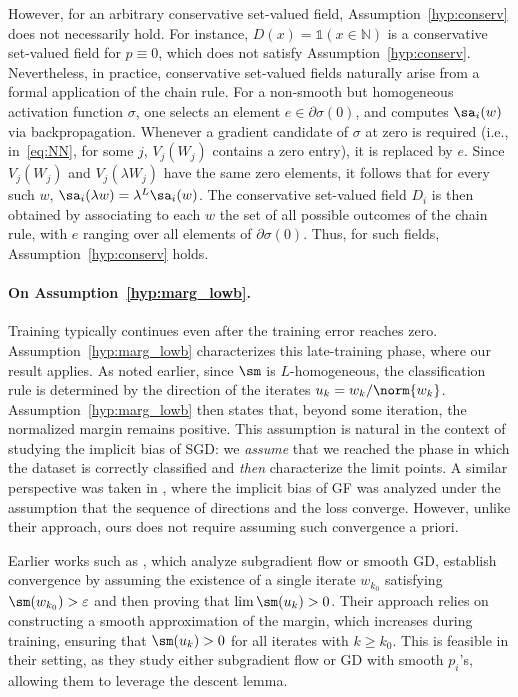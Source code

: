 However, for an arbitrary conservative set-valued field, Assumption~\ref{hyp:conserv} does not necessarily hold. For instance, $D(x) = \mathds{1}(x \in \mathbb{N})$ is a conservative set-valued field for $p \equiv 0$, which does not satisfy Assumption~\ref{hyp:conserv}. Nevertheless, in practice, conservative set-valued fields naturally arise from a formal application of the chain rule. For a non-smooth but homogeneous activation function $\sigma$, one selects an element $e \in \partial \sigma (0)$, and computes $\sa_i(w)$ via backpropagation. Whenever a gradient candidate of $\sigma$ at zero is required (i.e., in~\eqref{eq:NN}, for some $j$, $V_j(W_j)$ contains a zero entry), it is replaced by $e$. 
Since $V_j(W_j)$ and $V_j(\lambda W_j)$ have the same zero elements, it follows that for every such $w$, $
\sa_i(\lambda w) = \lambda^L \sa_i(w)$. The conservative set-valued field $D_i$ is then obtained by associating to each $w$ the set of all possible outcomes of the chain rule, with $e$ ranging over all elements of $\partial \sigma(0)$. Thus, for such fields, Assumption~\ref{hyp:conserv} holds.


\paragraph{On Assumption~\ref{hyp:marg_lowb}.} Training typically continues even after the training error reaches zero.
Assumption~\ref{hyp:marg_lowb} characterizes this late-training phase, where our result applies. 
As noted earlier, since $\sm$ is $L$-homogeneous, the classification rule is determined by the direction of the  iterates $u_k=w_k/\norm{w_k}$. Assumption~\ref{hyp:marg_lowb} then states that, beyond some iteration, the normalized margin remains positive. 
This assumption is natural in the context of studying the implicit bias of SGD: we \emph{assume} that we reached the phase in which the dataset is correctly classified and \emph{then} characterize the limit points. A similar perspective was taken in  \cite{nacson2019lexicographic}, where the implicit bias of GF was analyzed under the assumption that the sequence of directions and the loss converge. However, unlike their approach, ours does not require assuming such convergence a priori.

Earlier works such as \cite{ji2020directional,Lyu_Li_maxmargin}, which analyze subgradient flow or smooth GD, establish convergence by assuming the existence of a single iterate $w_{k_0}$ satisfying $\sm(w_{k_0}) > \varepsilon$ and then proving that $\lim \sm(u_{k}) > 0$. Their approach relies on constructing a smooth approximation of the margin, which increases during training, ensuring that $\sm(u_k) > 0$ for all iterates with $k \geq k_0$. This is feasible in their setting, as they study either subgradient flow or GD with smooth $p_i$’s, allowing them to leverage the descent lemma.

